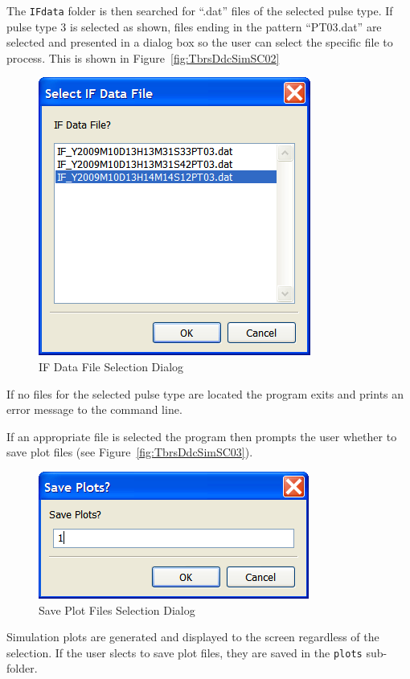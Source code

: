 \documentclass[12pt,english]{article}
\begin{document}
The \texttt{IFdata} folder is then searched for ``.dat'' files of the
selected pulse type. If pulse type 3 is selected as shown, files
ending in the pattern ``PT03.dat'' are selected and presented in a
dialog box so the user can select the specific file to process. This
is shown in Figure~\vref{fig:TbrsDdcSimSC02}
\begin{figure}[ht]
  \noindent \begin{centering}
  \includegraphics{TbrsDdcSimSC02.png}\medskip{}
  \caption{IF Data File Selection Dialog}
  \label{fig:TbrsDdcSimSC02}
  \par \end{centering}
\end{figure}

If no files for the selected pulse type are located the program exits
and prints an error message to the command line.

If an appropriate file is selected the program then prompts the user
whether to save plot files (see Figure~\vref{fig:TbrsDdcSimSC03}).
\begin{figure}[ht]
  \noindent \begin{centering}
  \includegraphics{TbrsDdcSimSC03.png}\medskip{}
  \caption{Save Plot Files Selection Dialog}
  \label{fig:TbrsDdcSimSC03}
  \par \end{centering}
\end{figure}
Simulation plots are generated and displayed to the screen regardless
of the selection. If the user slects to save plot files, they are
saved in the \texttt{plots} sub-folder.
\end{document}
